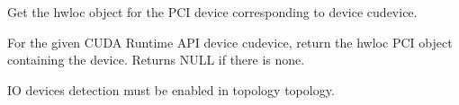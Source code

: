 Get the hwloc object for the PCI device corresponding to device {\ttfamily cudevice}. 

For the given CUDA Runtime API device {\ttfamily cudevice}, return the hwloc PCI object containing the device. Returns NULL if there is none.

IO devices detection must be enabled in topology {\ttfamily topology}. 